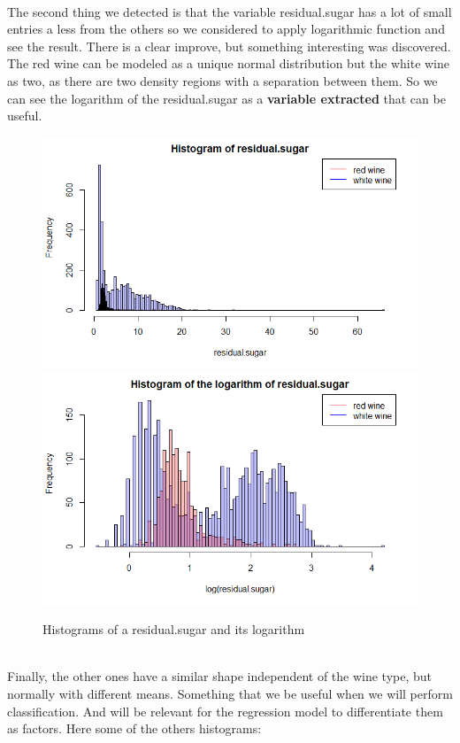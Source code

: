 \documentclass[10pt]{article}
\begin{document}
\ \\
The second thing we detected is that the variable residual.sugar has a lot of small entries a less from the others so we considered to apply logarithmic function and see the result. There is a clear improve, but something interesting was discovered. The red wine can be modeled as a unique normal distribution but the white wine as two, as there are two density regions with a separation between them. So we can see the logarithm of the residual.sugar as a \textbf{variable extracted} that can be useful.
\begin{figure}[H]
\centering
\caption{Histograms of a residual.sugar and its logarithm}
\includegraphics[scale=0.4]{histogram_of_residualsugar}
\includegraphics[scale=0.4]{histogram_of_log_residualsugar}
\end{figure}
\ \\
Finally, the other ones have a similar shape independent of the wine type, but normally with different means. Something that we be useful when we will perform classification. And will be relevant for the regression model to differentiate them as factors. Here some of the others histograms: \\
\end{document}
